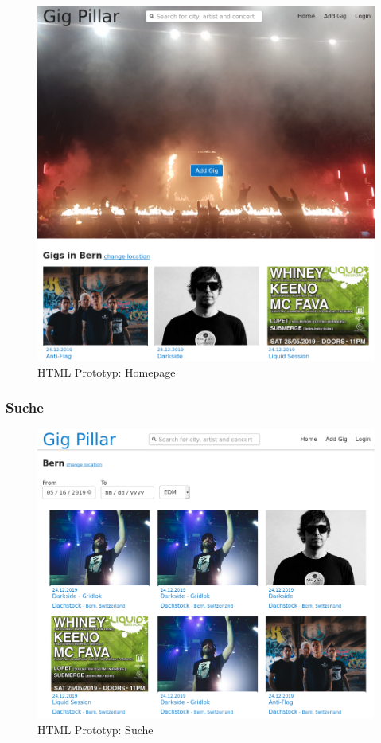 \begin{figure}[!htb]
  \centering
  \includegraphics[width=1\textwidth]{figures/html-prototype.png}
  \caption{HTML Prototyp: Homepage}
\end{figure}

\clearpage
\subsubsection{Suche}

\begin{figure}[!htb]
  \centering
  \includegraphics[width=1\textwidth]{realisierung/html-proto-search.png}
  \caption{HTML Prototyp: Suche}
\end{figure}

